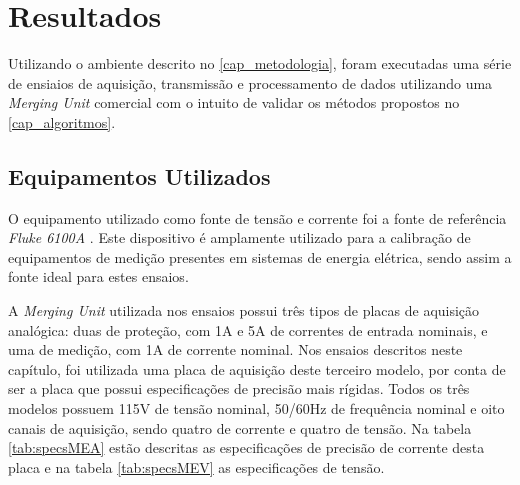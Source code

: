 



\chapter{Resultados}
\label{cap_resultados}

Utilizando o ambiente descrito no \autoref{cap_metodologia}, foram executadas uma série de ensiaios de aquisição, transmissão e processamento de dados utilizando uma \textit{Merging Unit} comercial com o intuito de validar os métodos propostos no \autoref{cap_algoritmos}. 

\section{Equipamentos Utilizados}

O equipamento utilizado como fonte de tensão e corrente foi a fonte de referência \textit{Fluke 6100A} \cite{fluke6100a}. Este dispositivo é amplamente utilizado para a calibração de equipamentos de medição presentes em sistemas de energia elétrica, sendo assim a fonte ideal para estes ensaios.

A \textit{Merging Unit} utilizada nos ensaios possui três tipos de placas de aquisição analógica: duas de proteção, com 1A e 5A de correntes de entrada nominais, e uma de medição, com 1A de corrente nominal. Nos ensaios descritos neste capítulo, foi utilizada uma placa de aquisição deste terceiro modelo, por conta de ser a placa que possui especificações de precisão mais rígidas. Todos os três modelos possuem 115V de tensão nominal, 50/60Hz de frequência nominal e oito canais de aquisição, sendo quatro de corrente e quatro de tensão. Na tabela \ref{tab:specsMEA} estão descritas as especificações de precisão de corrente desta placa e na tabela \ref{tab:specsMEV} as especificações de tensão.


